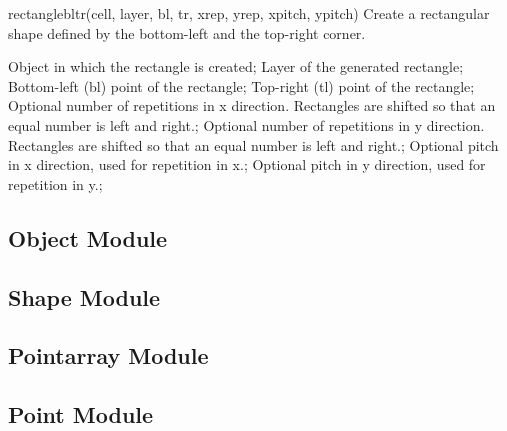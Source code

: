 \begin{APIfunc}{rectanglebltr(cell, layer, bl, tr, xrep, yrep, xpitch, ypitch)}
    Create a rectangular shape defined by the bottom-left and the top-right corner.
    \begin{APIparameters}
            Object in which the rectangle is created;
            Layer of the generated rectangle;
            Bottom-left (bl) point of the rectangle;
            Top-right (tl) point of the rectangle;
            Optional number of repetitions in x direction.
            Rectangles are shifted so that an equal number is left and right.;
            Optional number of repetitions in y direction.
            Rectangles are shifted so that an equal number is left and right.;
            Optional pitch in x direction, used for repetition in x.;
            Optional pitch in y direction, used for repetition in y.;
    \end{APIparameters}
\end{APIfunc}

\subsection{Object Module}
\subsection{Shape Module}
\subsection{Pointarray Module}
\subsection{Point Module}


